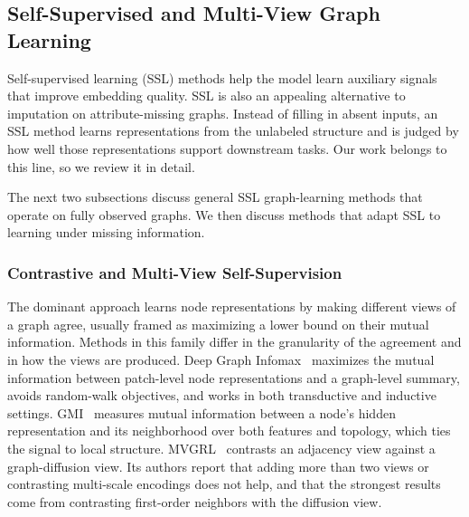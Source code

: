 
\subsection{Self-Supervised and Multi-View Graph Learning}


Self-supervised learning (SSL) methods help the model learn auxiliary signals that improve embedding quality.
SSL is also an appealing alternative to imputation on
attribute-missing graphs. Instead of filling in absent inputs, an SSL method learns
representations from the unlabeled structure and is judged by how well those
representations support downstream tasks. Our work belongs to this line, so we review it in detail.

The next two subsections discuss general SSL graph-learning methods that operate on fully observed graphs. We then discuss methods that adapt SSL to learning under missing information.


\subsubsection{Contrastive and Multi-View Self-Supervision}
\label{sec:related-contrastive}

The dominant approach learns node representations by making different views of a graph
agree, usually framed as maximizing a lower bound on their mutual information. Methods in
this family differ in the granularity of the agreement and in how the views are produced.
Deep Graph Infomax~\cite{velickovic2019dgi} maximizes the mutual information between patch-level node
representations and a graph-level summary, avoids random-walk objectives, and works in both
transductive and inductive settings. GMI~\cite{peng2020gmi} measures mutual information between a node's
hidden representation and its neighborhood over both features and topology, which ties the
signal to local structure. MVGRL~\cite{hassani2020mvgrl} contrasts an adjacency view against a graph-diffusion
view. Its authors report that adding more than two views or contrasting multi-scale
encodings does not help, and that the strongest results come from contrasting first-order
neighbors with the diffusion view.

